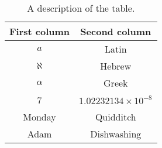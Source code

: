 \begin{table}
\centering
\begin{tabular}{|c|c|}
\hline
First column & Second column\\\hline
$a$          & Latin \\
$\aleph$     & Hebrew \\
$\alpha$     & Greek \\
7            & $1.02232134\times10^{-8}$\\
Monday       & Quidditch\\
Adam         & Dishwashing\\
\hline
\end{tabular}
\caption{A description of the table.} 

\label{Tab2}
\end{table}

